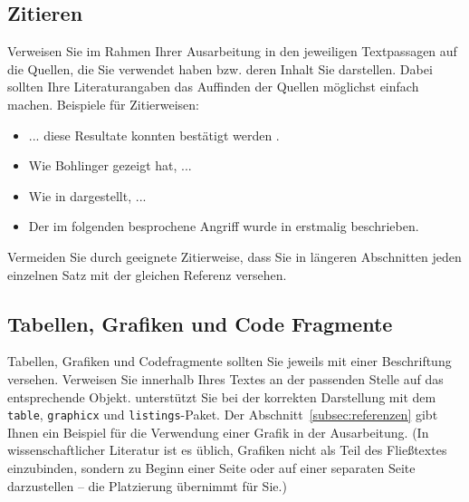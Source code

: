 \subsection{Zitieren}
Verweisen Sie im Rahmen Ihrer Ausarbeitung in den jeweiligen Textpassagen auf die Quellen, die Sie
verwendet haben bzw. deren Inhalt Sie darstellen.  Dabei sollten Ihre Literaturangaben das Auffinden
der Quellen möglichst einfach machen.  Beispiele für Zitierweisen:
\begin{itemize}
\item ... diese Resultate konnten bestätigt werden \cite{stickel2009wissenschaftliches}.
\item Wie Bohlinger \cite{BOH07} gezeigt hat, ...
\item Wie in \cite{KAR} dargestellt, ...
\item Der im folgenden besprochene Angriff wurde in \cite{DBLP:conf/ccs/AdrianBDGGHHSTV15} erstmalig
  beschrieben.
\end{itemize}
Vermeiden Sie durch geeignete Zitierweise, dass Sie in längeren Abschnitten jeden einzelnen Satz mit
der gleichen Referenz versehen.

\subsection{Tabellen, Grafiken und Code Fragmente}
Tabellen, Grafiken und Codefragmente sollten Sie jeweils mit einer Beschriftung versehen. Verweisen
Sie innerhalb Ihres Textes an der passenden Stelle auf das entsprechende Objekt. 
unterstützt Sie bei der korrekten Darstellung mit dem \texttt{table}, \texttt{graphicx} und
\texttt{listings}-Paket. Der Abschnitt~\ref{subsec:referenzen} gibt Ihnen ein Beispiel für die
Verwendung einer Grafik in der Ausarbeitung. (In wissenschaftlicher Literatur ist es üblich,
Grafiken nicht als Teil des Fließtextes einzubinden, sondern zu Beginn einer Seite oder auf einer
separaten Seite darzustellen -- die Platzierung übernimmt  für Sie.)


